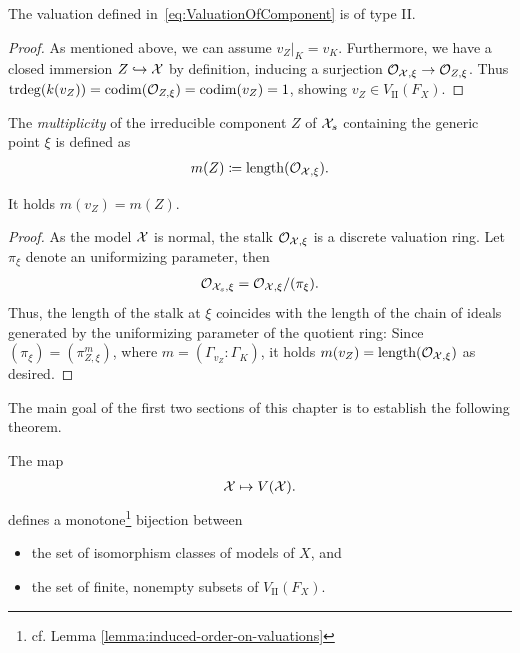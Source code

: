 \begin{proposition}\label{prop:WellDefOfInducedValuation}
    The valuation defined in~\eqref{eq:ValuationOfComponent} is of type \textrm{II}.
\end{proposition}

\begin{proof}
    As mentioned above, we can assume $v_Z|_K = v_K$.
    Furthermore, we have a closed immersion $Z \hookrightarrow \mathcal X$
    by definition, inducing a surjection $\mathcal{O}_{\mathcal X,\xi} \to \mathcal{O}_{Z,\xi}$.
    Thus $\operatorname{trdeg}(k(v_Z)) = \operatorname{codim}(\mathcal{O}_{Z,\xi}) = \operatorname{codim}(v_Z) = 1$, showing $v_Z \in V_\textrm{II}(F_X)$.
\end{proof}

\begin{definition}
    The \textit{multiplicity} of the irreducible component $Z$ of $\mathcal X_s$ containing the generic point $\xi$ is defined as
    \begin{align}
        m(Z) \coloneqq \operatorname{length}(\mathcal{O}_{\mathcal X,\xi}).
    \end{align}
\end{definition}

\begin{proposition}\label{prop:multiplicities-coincide}
    It holds $m(v_Z) = m(Z)$.
\end{proposition}

\begin{proof}
    As the model $\mathcal X$ is normal, the stalk $\mathcal{O}_{\mathcal X, \xi}$ is a discrete valuation ring\@.
    Let $\pi_\xi$ denote an uniformizing parameter, then
    \begin{align}
        \mathcal{O}_{\mathcal X_s,\xi} = \mathcal{O}_{\mathcal X,\xi}/(\pi_\xi).
    \end{align}
    Thus, the length of the stalk at $\xi$ coincides with the length of the chain of ideals generated
    by the uniformizing parameter of the quotient ring:
    Since $(\pi_\xi) = (\pi_{Z,\xi}^m)$, where $m = (\Gamma_{v_Z}:\Gamma_K)$, it holds $m(v_Z) = \operatorname{length}(\mathcal{O}_{\mathcal X, \xi})$ as desired.
\end{proof}

The main goal of the first two sections of this chapter is to establish the following theorem.

\begin{theorem}\label{thm:bijectionModelsAndComponents}
    The map
    \begin{align} \label{eq:mapFromModelToValuation}
        \mathcal X \mapsto V(\mathcal X).
    \end{align}
    defines a monotone\footnote{cf. Lemma \ref{lemma:induced-order-on-valuations}} bijection between
    \begin{itemize}
        \item the set of isomorphism classes of models of $X$, and
        \item the set of finite, nonempty subsets of $V_\textrm{II}(F_X)$.
    \end{itemize}
\end{theorem}

